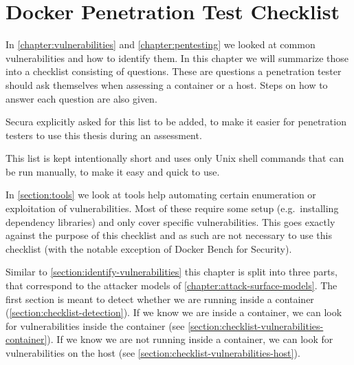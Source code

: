 \chapter{Docker Penetration Test Checklist}\label{chapter:checklist}
In \autoref{chapter:vulnerabilities} and \autoref{chapter:pentesting} we looked at common vulnerabilities and how to identify them. In this chapter we will summarize those into a checklist consisting of questions. These are questions a penetration tester should ask themselves when assessing a container or a host. Steps on how to answer each question are also given.

Secura explicitly asked for this list to be added, to make it easier for penetration testers to use this thesis during an assessment.

This list is kept intentionally short and uses only Unix shell commands that can be run manually, to make it easy and quick to use.

\medskip

In \autoref{section:tools} we look at tools help automating certain enumeration or exploitation of vulnerabilities. Most of these require some setup (e.g.\ installing dependency libraries) and only cover specific vulnerabilities. This goes exactly against the purpose of this checklist and as such are not necessary to use this checklist (with the notable exception of Docker Bench for Security).

\medskip

Similar to \autoref{section:identify-vulnerabilities} this chapter is split into three parts, that correspond to the attacker models of \autoref{chapter:attack-surface-models}. The first section is meant to detect whether we are running inside a container (\autoref{section:checklist-detection}). If we know we are inside a container, we can look for vulnerabilities inside the container (see \autoref{section:checklist-vulnerabilities-container}). If we know we are not running inside a container, we can look for vulnerabilities on the host (see \autoref{section:checklist-vulnerabilities-host}).




